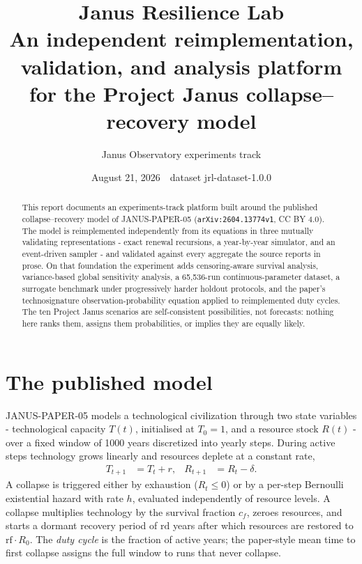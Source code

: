 \documentclass[11pt]{article}
\title{\textbf{Janus Resilience Lab}\\[4pt]
\large An independent reimplementation, validation, and analysis platform\\
for the Project Janus collapse--recovery model}
\author{Janus Observatory experiments track}
\date{August 21, 2026 \,\textperiodcentered\, dataset jrl-dataset-1.0.0}
\begin{document}
\maketitle

\begin{abstract}
\noindent
This report documents an experiments-track platform built around the published
collapse--recovery model of JANUS-PAPER-05 (\texttt{arXiv:2604.13774v1}, CC BY 4.0).
The model is reimplemented independently from its equations in three mutually
validating representations - exact renewal recursions, a year-by-year simulator, and an
event-driven sampler - and validated against every aggregate the source reports in
prose. On that foundation the experiment adds censoring-aware survival analysis,
variance-based global sensitivity analysis, a 65{,}536-run continuous-parameter
dataset, a surrogate benchmark under progressively harder holdout protocols, and the
paper's technosignature observation-probability equation applied to reimplemented duty
cycles. The ten Project Janus scenarios are self-consistent possibilities, not
forecasts: nothing here ranks them, assigns them probabilities, or implies they are
equally likely.
\end{abstract}

\tableofcontents

\section{The published model}
\label{sec:model}

JANUS-PAPER-05 models a technological civilization through two state variables -
technological capacity $T(t)$, initialised at $T_0 = 1$, and a resource stock $R(t)$ -
over a fixed window of 1000 years discretized into yearly steps. During active steps
technology grows linearly and resources deplete at a constant rate,
\begin{align}
  T_{t+1} &= T_t + r, &
  R_{t+1} &= R_t - \delta .
\end{align}
A collapse is triggered either by exhaustion ($R_t \le 0$) or by a per-step Bernoulli
existential hazard with rate $h$, evaluated independently of resource levels. A collapse
multiplies technology by the survival fraction $c_f$, zeroes resources, and starts a
dormant recovery period of $\mathrm{rd}$ years after which resources are restored to
$\mathrm{rf} \cdot R_0$. The \emph{duty cycle} is the fraction of active years; the
paper-style mean time to first collapse assigns the full window to runs that never
collapse.
\end{document}

